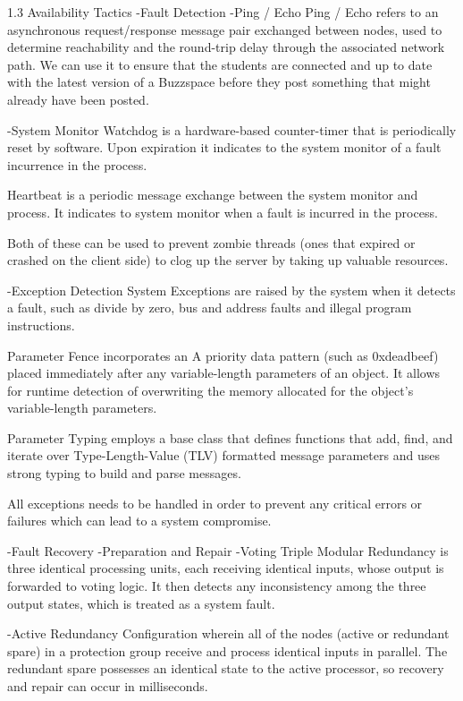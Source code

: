 1.3 Availability Tactics
	-Fault Detection
		-Ping / Echo
			Ping / Echo refers to an asynchronous request/response message pair exchanged between nodes, used to determine reachability and the round-trip delay through the associated network path. We can use it to ensure that the students are connected and up to date with the latest version of a Buzzspace before they post something that might already have been posted.
			
		-System Monitor
			Watchdog is a hardware-based counter-timer that is periodically reset by software. Upon expiration it indicates to the system monitor of a fault incurrence in the process.
			
			Heartbeat is a periodic message exchange between the system monitor and process. It indicates to system monitor when a fault is incurred in the process.
			
			Both of these can be used to prevent zombie threads (ones that expired or crashed on the client side) to clog up the server by taking up valuable resources.
		
		-Exception Detection
			System Exceptions are raised by the system when it detects a fault, such as divide by zero, bus and address faults and illegal program instructions.
			
			Parameter Fence incorporates an A priority data pattern (such as 0xdeadbeef) placed immediately after any variable-length parameters of an object. It allows for runtime detection of overwriting the memory allocated for the object's variable-length parameters.
			
			Parameter Typing employs a base class that defines functions that add, find, and iterate over Type-Length-Value (TLV) formatted message parameters and uses strong typing to build and parse messages.
			
			All exceptions needs to be handled in order to prevent any critical errors or failures which can lead to a system compromise.
		
	-Fault Recovery
		-Preparation and Repair
			-Voting
				Triple Modular Redundancy is three identical processing units, each receiving identical inputs, whose output is forwarded to voting logic. It then detects any inconsistency among the three output states, which is treated as a system fault.
			
			-Active Redundancy
				Configuration wherein all of the nodes (active or redundant spare) in a protection group receive and process identical inputs in parallel. The redundant spare possesses an identical state to the active processor, so recovery and repair can occur in milliseconds.
			
